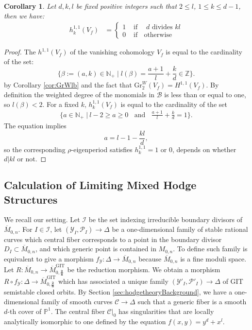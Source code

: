 \documentclass[12pt, letterpaper]{amsart}
\theoremstyle{plain}
\newtheorem{corollary}[theorem]{Corollary}
\theoremstyle{definition}
\begin{document}
\begin{corollary}\label{maincorollary}
Let $d, k, l$ be fixed positive integers such that  
$2 \leq l$, $1\leq k \leq d-1$, then we have:
\begin{align*}
h^{1,1}_k\left(  V_f \right) 
&=
\begin{cases}
1 & \text{ if } \;  \text{ $d$ divides $kl$} \\
0 & \text{ if } \;  \text{ otherwise }  
\end{cases}
\end{align*}
\end{corollary}
\begin{proof}
The $h^{1,1}(V_f)$ of the vanishing cohomology $V_f$ is equal to the cardinality of the set:  
$$
\{
\beta:= (a,k) \in \mathbb{N}_+
\; |\; 
l(\beta) = \frac{a+1}{l}+\frac{k}{d}\in \mathbb{Z}\}.
$$
by Corollary \ref{cor:GrWlb}  and the fact that $\mathrm{Gr}^{W}_2(V_f) = H^{1,1}(V_f)$. 
By definition the weighted degree of the monomials in $\mathcal{B}$
is less than or equal to one, so $l(\beta)< 2$. For a fixed $k$, $h^{1,1}_k(V_f)$
is equal to the cardinality of the set
\begin{align*}
\lbrace
a \in \mathbb{N}_{+} \; | \
l-2 \geq a \geq 0 
\;\; \text{ and } \;\;
\frac{a+1}{l}+\frac{k}{d}=1
\rbrace.
\end{align*}
The equation implies
\[
a = 
l-1-\frac{kl}{d},
\]
so the corresponding $\rho$-eigenperiod satisfies $h_k^{1,1}=1$ or $0$, depends on whether $d|kl$ or not.  
\end{proof}

\subsection{Calculation of Limiting Mixed Hodge Structures}
\label{sec:ExtensionPureLocus}
We recall our setting. Let $\mathcal{I}$ be the set indexing irreducible boundary divisors of $\overline{M}_{0,n}$. For $I\in \mathcal{I}$, let $\left( \mathcal{Y}_{I}, \mathcal{P}_I \right) \to \Delta$ be a one-dimensional family of stable rational curves which central fiber corresponds to a point in the boundary divisor $D_I \subset \overline{M}_{0,n}$, and which generic point is contained in $M_{0,n}$. To define such family is equivalent to give a morphism 
$f_{\mathcal{Y}}:\Delta \to \overline{M}_{0,n}$
because $\overline{M}_{0,n}$ is a fine moduli space. Let 
$R: \overline{M}_{0,n} \to \overline{M}^{\mathrm{GIT}}_{0,\mathbf{\frac{2}{n}}}$ be the reduction morphism. We obtain  a morphism
$R\circ f_{\mathcal{Y}}:\Delta \to 
\overline{M}^{\mathrm{GIT}}_{0,\mathbf{\frac{2}{n}}}$ which has associated a unique family 
$\left( \mathcal{Y}'_{I}, \mathcal{P}'_I \right) \to \Delta$ of GIT semistable closed orbits. 
By Section \ref{sec:hodgetheoryBackground}, we have a one-dimensional family of smooth curves $\mathcal{C} \to \Delta$  such that a generic fiber is a smooth $d$-th cover of $\mathbb{P}^1$. 
The central fiber $\mathcal{C}|_0$ has singularities that are locally analytically isomorphic to one defined by the equation $f(x,y)=y^d + x^l$.
\end{document}
